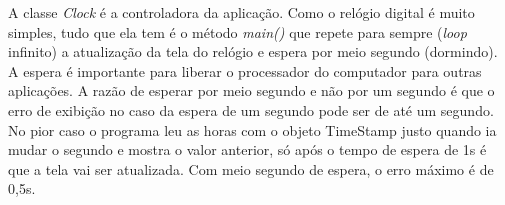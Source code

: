 \documentclass[
	11pt,				%
	openright,
	twoside,			%
	a4paper,			%
	english,			%
	french,
	brazil,				%
	sumario=tradicional
	]{abntex2}
\begin{document}
A classe \emph{Clock} é a controladora da aplicação. Como o relógio digital é muito simples, tudo que ela tem é o método \emph{main()} que repete para sempre (\emph{loop} infinito) a atualização da tela do relógio e espera por meio segundo (dormindo). A espera é importante para liberar o processador do computador para outras aplicações. A razão de esperar por meio segundo e não por um segundo é que o erro de exibição no caso da espera de um segundo pode ser de até um segundo. No pior caso o programa leu as horas com o objeto TimeStamp justo quando ia mudar o segundo e mostra o valor anterior, só após o tempo de espera de 1s é que a tela vai ser atualizada. Com meio segundo de espera, o erro máximo é de 0,5s.

% 

%
%
%

\postextual



%
%
% 



\
\end{document}
